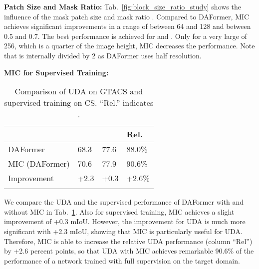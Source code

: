 \documentclass[10pt,twocolumn,letterpaper]{article}
\begin{document}
\noindent\textbf{Patch Size and Mask Ratio:}
Tab.~\ref{fig:block_size_ratio_study} shows the influence of the mask patch size  and mask ratio . Compared to DAFormer, MIC achieves significant improvements in a range of  between 64 and 128 and  between 0.5 and 0.7. The best performance is achieved for  and . Only for a very large  of 256, which is a quarter of the image height, MIC decreases the performance. Note that  is internally divided by 2 as DAFormer uses half resolution. 

\noindent\textbf{MIC for Supervised Training:}
\begin{table}[tb]
\centering
\caption{Comparison of UDA on GTACS and supervised training on CS. ``Rel.'' indicates .}
\label{tab:supervised}
\setlength{\tabcolsep}{5pt}
\scriptsize
\begin{tabular}{llll}
\hline
                 &            &     & Rel.   \\
\hline\hline
\arrayrulecolor{gray}
DAFormer~\cite{hoyer2021daformer} & 68.3 & 77.6 & 88.0\%   \\
MIC (DAFormer)  & 70.6 & 77.9 & 90.6\%   \\
\hline
Improvement      & +2.3          & +0.3          & +2.6\% \\
\arrayrulecolor{black}
\hline
\end{tabular}
\end{table}
 We compare the UDA and the supervised performance of DAFormer with and without MIC in Tab.~\ref{tab:supervised}. Also for supervised training, MIC achieves a slight improvement of +0.3 mIoU. However, the improvement for UDA is much more significant with +2.3 mIoU, showing that MIC is particularly useful for UDA. Therefore, MIC is able to increase the relative UDA performance (column ``Rel'') by +2.6 percent points, so that UDA with MIC achieves remarkable 90.6\% of the performance of a network trained with full supervision on the target domain.
\end{document}
